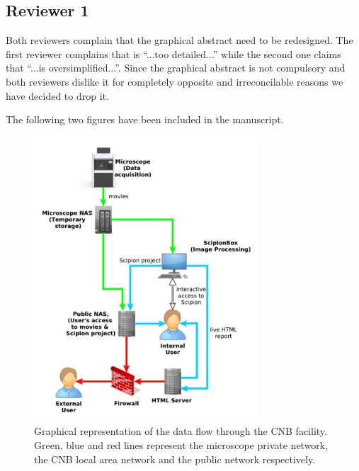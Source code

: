 \documentclass[a4paper,12pt]{article}
\date{06/09/18}
\def\cnb{CNB\xspace}
\def\cnb{CNB\xspace}
\begin{document}
\begin{reviewer}
\section*{Reviewer 1}

\reply  Both reviewers complain that the graphical abstract need to be redesigned. The first reviewer complains that is ``...too detailed...'' while the second one claims that ``...is oversimplified...''. Since the graphical abstract is not compulsory  and both reviewers dislike it for completely opposite and irreconcilable reasons we have decided to drop it.



\reply The following two figures have been included in the manuscript. 

\begin{figure}
  \centering
      \includegraphics[width=0.75\textwidth]{images/diagram.pdf}
  \caption{Graphical representation of the data flow through the CNB facility. Green, blue and red lines represent the microscope private network, the \cnb local area network and the public network respectively.}
  \label{fig:cnbpipeline}


\end{figure}
\end{reviewer}
\end{document}
